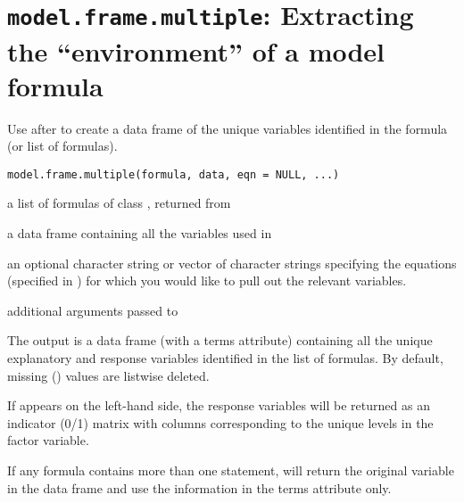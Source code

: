  \section{{\tt model.frame.multiple}: Extracting the ``environment'' of a model formula}\label{ss:model.frame.multiple}
\begin{Description}\relax
Use  after  to create a
data frame of the unique variables identified in the formula (or list
of formulas).
\end{Description}
\begin{Usage}
\begin{verbatim}
model.frame.multiple(formula, data, eqn = NULL, ...)
\end{verbatim}
\end{Usage}
\begin{Arguments}
\begin{ldescription}
\item[\code{formula}] a list of formulas of class , returned from 
\item[\code{data}] a data frame containing all the variables used in 
\item[\code{eqn}] an optional character string or vector of character strings specifying 
the equations (specified in ) for which you would like to 
pull out the relevant variables.
\item[\code{...}] additional arguments passed to 
\end{ldescription}
\end{Arguments}
\begin{Value}
The output is a data frame (with a terms attribute) containing all the
unique explanatory and response variables identified in the list of
formulas.  By default, missing () values are listwise deleted.

If  appears on the left-hand side, the response
variables will be returned as an indicator (0/1) matrix with columns
corresponding to the unique levels in the factor variable.  

If any formula contains more than one  statement, 
will return the original variable in the data frame and use the  information in the terms 
attribute only.
\end{Value}
